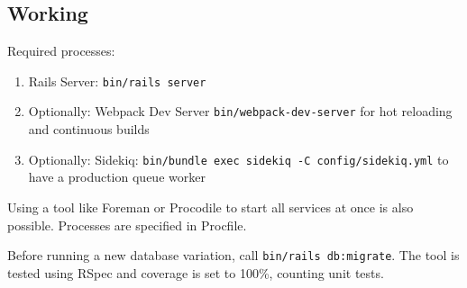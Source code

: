 \documentclass[11pt]{article}
\begin{document}
\subsection{Working}
Required processes:
\begin{enumerate}
	\item Rails Server: \verb|bin/rails server|
	\item Optionally: Webpack Dev Server \verb|bin/webpack-dev-server| for hot reloading and continuous builds
	\item Optionally: Sidekiq: \verb|bin/bundle exec sidekiq -C config/sidekiq.yml| to have a production queue worker
\end{enumerate}

Using a tool like Foreman or Procodile to start all services at once is also possible. Processes are specified in Procfile.

Before running a new database variation, call \verb|bin/rails db:migrate|.
The tool is tested using RSpec and coverage is set to 100\%, counting unit tests.
\end{document}
